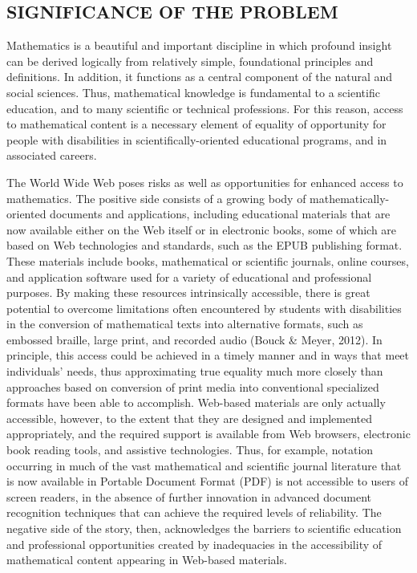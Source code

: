 \documentclass[11.5pt]{sig-alternate} %
\begin{document}
\begin{large}
\section*{SIGNIFICANCE OF THE PROBLEM}

Mathematics is a beautiful and important discipline in which profound insight can be derived logically from relatively simple, foundational principles and definitions. In addition, it functions as a central component of the natural and social sciences. Thus, mathematical knowledge is fundamental to a scientific education, and to many scientific or technical professions. For this reason, access to mathematical content is a necessary element of equality of opportunity for people with disabilities in scientifically-oriented educational programs, and in associated careers.

The World Wide Web poses risks as well as opportunities for enhanced access to mathematics. The positive side consists of a growing body of mathematically-oriented documents and applications, including educational materials that are now available either on the Web itself or in electronic books, some of which are based on Web technologies and standards, such as the EPUB publishing format. These materials include books, mathematical or scientific journals, online courses, and application software used for a variety of educational and professional purposes. By making these resources intrinsically accessible, there is great potential to overcome limitations often encountered by students with disabilities in the conversion of mathematical texts into alternative formats, such as embossed braille, large print, and recorded audio (Bouck \& Meyer, 2012). In principle, this access could be achieved in a timely manner and in ways that meet individuals’ needs, thus approximating true equality much more closely than approaches based on conversion of print media into conventional specialized formats have been able to accomplish. Web-based materials are only actually accessible, however, to the extent that they are designed and implemented appropriately, and the required support is available from Web browsers, electronic book reading tools, and assistive technologies. Thus, for example, notation occurring in much of the vast mathematical and scientific journal literature that is now available in Portable Document Format (PDF) is not accessible to users of screen readers, in the absence of further innovation in advanced document recognition techniques that can achieve the required levels of reliability. The negative side of the story, then, acknowledges the barriers to scientific education and professional opportunities created by inadequacies in the accessibility of mathematical content appearing in Web-based materials.


\end{large}
\end{document}
